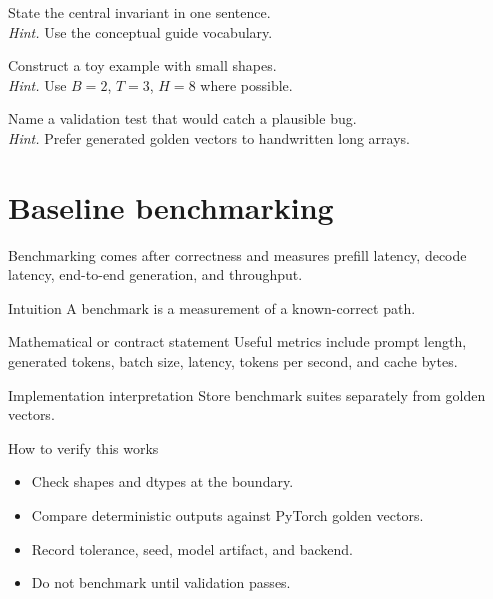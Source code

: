 \begin{chapterexercises}
\item State the central invariant in one sentence.\\
\textit{Hint.} Use the conceptual guide vocabulary.
\item Construct a toy example with small shapes.\\
\textit{Hint.} Use $B=2$, $T=3$, $H=8$ where possible.
\item Name a validation test that would catch a plausible bug.\\
\textit{Hint.} Prefer generated golden vectors to handwritten long arrays.
\end{chapterexercises}

\chapter{Baseline benchmarking}
\label{ch:baseline-benchmarking}
Benchmarking comes after correctness and measures prefill latency, decode latency, end-to-end generation, and throughput.



\begin{intuitionbox}{Intuition}
A benchmark is a measurement of a known-correct path.
\end{intuitionbox}

\begin{definitionbox}{Mathematical or contract statement}
Useful metrics include prompt length, generated tokens, batch size, latency, tokens per second, and cache bytes.
\end{definitionbox}

\begin{implementationbox}{Implementation interpretation}
Store benchmark suites separately from golden vectors.
\end{implementationbox}

\begin{verificationbox}{How to verify this works}
\begin{itemize}
\item Check shapes and dtypes at the boundary.
\item Compare deterministic outputs against PyTorch golden vectors.
\item Record tolerance, seed, model artifact, and backend.
\item Do not benchmark until validation passes.
\end{itemize}
\end{verificationbox}

